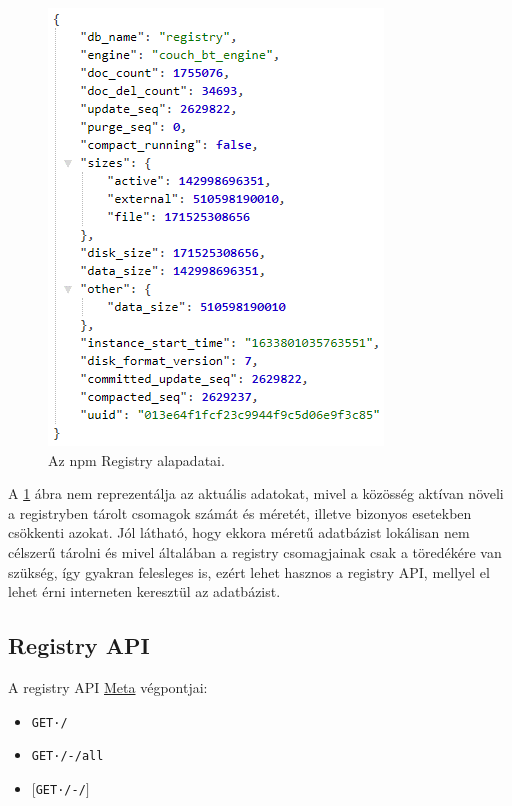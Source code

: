 \begin{figure}[h]
	\centering
	\includegraphics[scale=0.75]{images/registry_data.png}
	\caption{Az npm Registry alapadatai.}
	\label{fig:registry}
\end{figure}

A \ref{fig:registry} ábra nem reprezentálja az aktuális adatokat, mivel a közösség aktívan növeli a registryben tárolt csomagok számát és méretét, illetve bizonyos esetekben csökkenti azokat. Jól látható, hogy ekkora méretű adatbázist lokálisan nem célszerű tárolni és mivel általában a registry csomagjainak csak a töredékére van szükség, így gyakran felesleges is, ezért lehet hasznos a registry API, mellyel el lehet érni interneten keresztül az adatbázist.\\

\begin{flushright}
	\cite{npm-registry}
\end{flushright}

\subsection{Registry API}

A registry API \underline{Meta} végpontjai:

\begin{itemize}
	\item \texttt{GET·/}
	\item \texttt{GET·/-/all}
	\item \texttt{$\big[$GET·/-/$\big]$}
\end{itemize}

